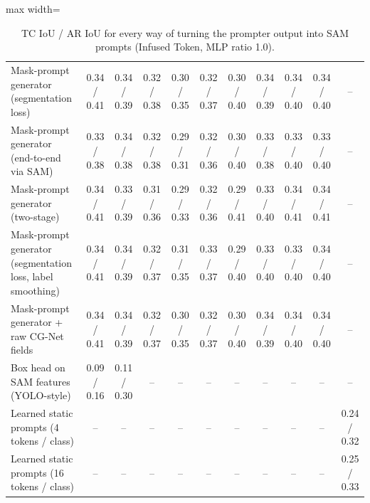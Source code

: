 \begin{table}[htbp]
\begin{adjustbox}{max width=\linewidth}
\begin{tabular}{lcccccccccc}
Mask-prompt generator (segmentation loss) & 0.34 / 0.41 & 0.34 / 0.39 & 0.32 / 0.38 & 0.30 / 0.35 & 0.32 / 0.37 & 0.30 / 0.40 & 0.34 / 0.39 & 0.34 / 0.40 & 0.34 / 0.40 & -- \\
Mask-prompt generator (end-to-end via SAM) & 0.33 / 0.38 & 0.34 / 0.38 & 0.32 / 0.38 & 0.29 / 0.31 & 0.32 / 0.36 & 0.30 / 0.40 & 0.33 / 0.38 & 0.33 / 0.40 & 0.33 / 0.40 & -- \\
Mask-prompt generator (two-stage) & 0.34 / 0.41 & 0.33 / 0.39 & 0.31 / 0.36 & 0.29 / 0.33 & 0.32 / 0.36 & 0.29 / 0.41 & 0.33 / 0.40 & 0.34 / 0.41 & 0.34 / 0.41 & -- \\
Mask-prompt generator (segmentation loss, label smoothing) & 0.34 / 0.41 & 0.34 / 0.39 & 0.32 / 0.37 & 0.31 / 0.35 & 0.33 / 0.37 & 0.29 / 0.40 & 0.33 / 0.40 & 0.33 / 0.40 & 0.34 / 0.40 & -- \\
Mask-prompt generator + raw CG-Net fields & 0.34 / 0.41 & 0.34 / 0.39 & 0.32 / 0.37 & 0.30 / 0.35 & 0.32 / 0.37 & 0.30 / 0.40 & 0.34 / 0.39 & 0.34 / 0.40 & 0.34 / 0.40 & -- \\
Box head on SAM features (YOLO-style) & 0.09 / 0.16 & 0.11 / 0.30 & -- & -- & -- & -- & -- & -- & -- & -- \\
Learned static prompts (4 tokens / class) & -- & -- & -- & -- & -- & -- & -- & -- & -- & 0.24 / 0.32 \\
Learned static prompts (16 tokens / class) & -- & -- & -- & -- & -- & -- & -- & -- & -- & 0.25 / 0.33 \\
\bottomrule
\end{tabular}
\end{adjustbox}
\caption{TC IoU / AR IoU for every way of turning the prompter output into SAM prompts (Infused Token, MLP ratio 1.0).}
\label{tab:prompt_conversion_infused_mlp1}
\end{table}
